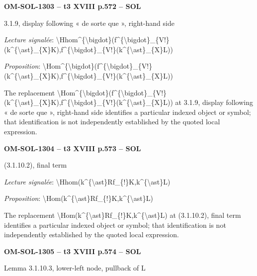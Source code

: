 \par\noindent\textbf{OM-SOL-1303 -- t3 XVIII p.572 -- SOL}\par
3.1.9, display following « de sorte que », right-hand side\par
\emph{Lecture signalée}: \textbackslash{}Hhom\textasciicircum{}\{\textbackslash{}bigdot\}(f\textasciicircum{}\{\textbackslash{}bigdot\}\_\{V!\}(k\textasciicircum{}\{\textbackslash{}ast\}\_\{X\}K),f\textasciicircum{}\{\textbackslash{}bigdot\}\_\{V!\}(k\textasciicircum{}\{\textbackslash{}ast\}\_\{X\}L))\par
\emph{Proposition}: \textbackslash{}Hom\textasciicircum{}\{\textbackslash{}bigdot\}(f\textasciicircum{}\{\textbackslash{}bigdot\}\_\{V!\}(k\textasciicircum{}\{\textbackslash{}ast\}\_\{X\}K),f\textasciicircum{}\{\textbackslash{}bigdot\}\_\{V!\}(k\textasciicircum{}\{\textbackslash{}ast\}\_\{X\}L))\par
The replacement \textbackslash{}Hom\textasciicircum{}\{\textbackslash{}bigdot\}(f\textasciicircum{}\{\textbackslash{}bigdot\}\_\{V!\}(k\textasciicircum{}\{\textbackslash{}ast\}\_\{X\}K),f\textasciicircum{}\{\textbackslash{}bigdot\}\_\{V!\}(k\textasciicircum{}\{\textbackslash{}ast\}\_\{X\}L)) at 3.1.9, display following « de sorte que », right-hand side identifies a particular indexed object or symbol; that identification is not independently established by the quoted local expression.\par
\par\noindent\textbf{OM-SOL-1304 -- t3 XVIII p.573 -- SOL}\par
(3.1.10.2), final term\par
\emph{Lecture signalée}: \textbackslash{}Hhom(k\textasciicircum{}\{\textbackslash{}ast\}Rf\_\{!\}K,k\textasciicircum{}\{\textbackslash{}ast\}L)\par
\emph{Proposition}: \textbackslash{}Hom(k\textasciicircum{}\{\textbackslash{}ast\}Rf\_\{!\}K,k\textasciicircum{}\{\textbackslash{}ast\}L)\par
The replacement \textbackslash{}Hom(k\textasciicircum{}\{\textbackslash{}ast\}Rf\_\{!\}K,k\textasciicircum{}\{\textbackslash{}ast\}L) at (3.1.10.2), final term identifies a particular indexed object or symbol; that identification is not independently established by the quoted local expression.\par
\par\noindent\textbf{OM-SOL-1305 -- t3 XVIII p.574 -- SOL}\par
Lemma 3.1.10.3, lower-left node, pullback of L\par
